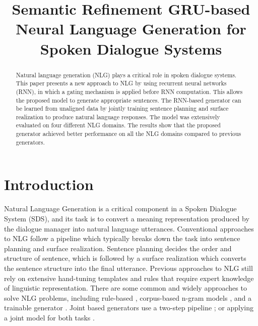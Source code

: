 \documentclass{llncs}
\title{Semantic Refinement GRU-based Neural Language Generation for Spoken Dialogue Systems}
\author{%
\textbf{Van-Khanh Tran\affmark[1,2] \and Le-Minh Nguyen\affmark[1]} \\ 
\institute{\affmark[1]Japan Advanced Institute of Science and Technology, JAIST\\
					1-1 Asahidai, Nomi, Ishikawa, 923-1292, Japan\\
\email{\{tvkhanh, nguyenml\}@jaist.ac.jp}\\
\affmark[2]University of Information and Communication Technology, ICTU\\
	Thai Nguyen University, Vietnam\\
\email{tvkhanh@ictu.edu.vn}}%
}
\begin{document}
\maketitle       

\begin{abstract}
Natural language generation (NLG) plays a critical role in spoken dialogue systems. This paper presents a new approach to NLG by using recurrent neural networks (RNN), in which a gating mechanism is applied before RNN computation. This allows the proposed model to generate appropriate sentences. The RNN-based generator can be learned from unaligned data by jointly training sentence planning and surface realization to produce natural language responses. The model was extensively evaluated on four different NLG domains. The results show that the proposed generator achieved better performance on all the NLG domains compared to previous generators.
\end{abstract}

\section{Introduction}\label{sec:introduction}
Natural Language Generation is a critical component in a Spoken Dialogue System (SDS), and its task is to convert a meaning representation produced by the dialogue manager into natural language utterances. Conventional approaches to NLG follow a pipeline which typically breaks down the task into sentence planning and surface realization. Sentence planning decides the order and structure of sentence, which is followed by a surface realization which converts the sentence structure into the final utterance. Previous approaches to NLG still rely on extensive hand-tuning templates and rules that require expert knowledge of linguistic representation. There are some common and widely approaches to solve NLG problems, including rule-based \cite{cheyer2014method}, corpus-based n-gram models \cite{oh2000stochastic}, and a trainable generator \cite{stent2004trainable}. Joint based generators use a two-step pipeline \cite{rieser2010optimising,duvsek2016sequence}; or applying a joint model for both tasks \cite{thwsjy15,wensclstm15}.
\end{document}

